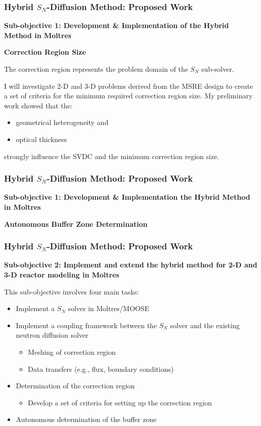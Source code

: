 \begin{frame}
  \frametitle{Hybrid $S_N$-Diffusion Method: Proposed Work}
  \textbf{Sub-objective 1: Development \& Implementation of the Hybrid Method in Moltres}
  \vspace{.2cm}
  
  \textbf{Correction Region Size}
  \vspace{.1cm}

  The correction region represents the problem domain of the $S_N$ sub-solver.
  \vspace{.2cm}
  
  I will investigate 2-D and 3-D problems derived from the MSRE design to create a set of criteria
  for the minimum required correction region size. My preliminary work showed that the:
  \begin{itemize}
    \item geometrical heterogeneity and
    \item optical thickness
  \end{itemize}
  strongly influence the \gls{SVDC} and the minimum correction region size.
\end{frame}

\begin{frame}
  \frametitle{Hybrid $S_N$-Diffusion Method: Proposed Work}
  \textbf{Sub-objective 1: Development \& Implementation the Hybrid Method in Moltres}
  \vspace{.2cm}

  \textbf{Autonomous Buffer Zone Determination}
  
\end{frame}

\begin{frame}
  \frametitle{Hybrid $S_N$-Diffusion Method: Proposed Work}
  \textbf{Sub-objective 2: Implement and extend the hybrid method for 2-D and 3-D reactor modeling
  in Moltres}
  \vspace{.2cm}

  This sub-objective involves four main tasks:
  \begin{itemize}
    \item Implement a $S_N$ solver in Moltres/MOOSE
    \item Implement a coupling framework between the $S_N$ solver and the existing neutron
      diffusion solver
    \begin{itemize}
      \item Meshing of correction region
      \item Data transfers (e.g., flux, boundary conditions)
    \end{itemize}
    \item Determination of the correction region
      \begin{itemize}
        \item Develop a set of criteria for setting up the correction region
      \end{itemize}
    \item Autonomous determination of the buffer zone
  \end{itemize}
\end{frame}

